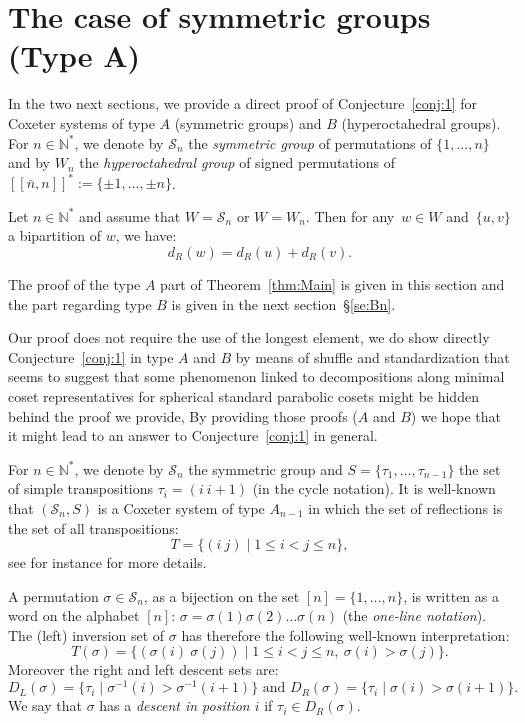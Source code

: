 \documentclass[Unicode]{cedram-alco}
\theoremstyle{definition}
\newcommand{\Sym}[1]{\mathcal{S}_{#1}}
\newcommand{\Symn}{\Sym{n}}
\newcommand{\Bsetnn}{[\![\bar{n},n ]\!]^*}
\begin{document}
\section{The case of symmetric groups (Type A)}\label{se:Sn}


In  the two next sections, we provide a direct proof of Conjecture~\ref{conj:1} for Coxeter systems of type $A$ (symmetric groups) and $B$ (hyperoctahedral groups). For $n\in\mathbb N^*$, we denote by $\mathcal S_n$ the {\em symmetric group} of permutations of $\{1,\dots , n\}$  and by $W_n$ the {\em hyperoctahedral group} of signed permutations of  $\Bsetnn:=\{\pm 1,\dots,\pm n\}$.


\begin{thm}\label{thm:Main} Let $n\in\mathbb N^*$ and assume  that $W=\mathcal S_n$ or $W=W_n$. Then for any~$w\in W$ and~$\{u,v\}$ a bipartition of $w$, we have:
 $$
 d_R(w)=d_R(u)+d_R(v).
 $$
\end{thm}


The proof of the type $A$  part of Theorem~\ref{thm:Main} is given in this section  and the part regarding type $B$ is given in the next section~\S\ref{se:Bn}. 

\begin{remark}\label{rem:GeneralizeAB} Our proof does not require the use of the longest element, we do show directly Conjecture~\ref{conj:1} in type $A$ and $B$ by means of shuffle and standardization that seems to suggest that some phenomenon linked to decompositions along minimal coset representatives for spherical standard parabolic cosets might be hidden behind the proof we provide, By providing those proofs ($A$ and $B$) we hope that it might lead to an answer to Conjecture~\ref{conj:1} in general.  
\end{remark}




For $n\in\mathbb N^*$, we denote by $\Symn$ the symmetric group and $S=\{\tau_1,\dots,\tau_{n-1}\}$ the set of simple transpositions $\tau_i = (i\ i+1)$ (in the cycle notation). It is well-known that $(\Symn,S)$ is a Coxeter system of type $A_{n-1}$ in which the set of reflections is the set of all transpositions:
$$
T=\{(i\ j)\mid 1\leq i<j\leq n\},
$$
see for instance \cite[Chapters 1 and 2]{BjBr05} for more details.

A permutation  $\sigma \in \Symn$, as a bijection on the set $[n]=\{1,\dots,n\}$, is written as a word on the alphabet $[n]$: $\sigma=\sigma(1) \sigma(2) \dots \sigma(n)$ (the  {\em one-line notation}). The (left) inversion set of $\sigma$ has therefore the following well-known interpretation: 
$$
T(\sigma)=\{(\sigma(i)\ \sigma(j))\mid 1\leq i<j\leq n,\ \sigma(i)>\sigma(j) \}.
$$
Moreover the right and left descent sets are:
$$
D_L(\sigma)=\{\tau_i \mid \sigma^{-1}(i)>\sigma^{-1}(i+1)\}\textrm{ and }D_R(\sigma)=\{\tau_i \mid \sigma(i)>\sigma(i+1)\}.
$$
We say that $\sigma$ has a \emph{descent in position $i$} if $\tau_i\in D_R(\sigma)$.
\end{document}
